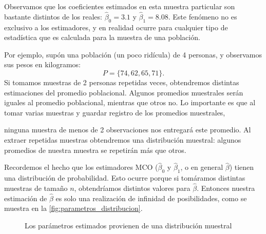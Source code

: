 \documentclass{report}\usepackage[]{graphicx}\usepackage[]{color}
\begin{document}
Observamos que los coeficientes estimados en esta muestra particular son bastante distintos de los reales: $\hat\beta_0 = 3.1$ y $\hat\beta_1 = 8.08$.
Este fenómeno no es exclusivo a los estimadores, y en realidad ocurre para cualquier tipo de estadística que es calculada para la muestra de una población.

Por ejemplo, supón una población (un poco ridícula) de 4 personas, y observamos sus pesos en kilogramos:
\begin{equation*}
P = \{74, 62, 65, 71\}.
\end{equation*}
Si tomamos muestras de 2 personas repetidas veces, obtendremos distintas estimaciones del promedio poblacional. Algunos promedios muestrales serán iguales al promedio poblacional, mientras que otros no. Lo importante es que al tomar varias muestras y guardar registro de los promedios muestrales,

ninguna muestra de menos de 2 observaciones nos entregará este promedio. Al extraer repetidas muestras obtendremos una distribución muestral: algunos promedios de nuestra muestra se repetirán más que otros.
\hrulefill

Recordemos el hecho que los estimadores MCO ($\hat\beta_0$ y $\hat\beta_1$, o en general $\hat\beta$) tienen una distribución de probabilidad.
Esto ocurre porque si tomáramos distintas muestras de tamaño $n$, obtendríamos distintos valores para $\hat\beta$.
Entonces nuestra estimación de $\hat\beta$ es solo una realización de infinidad de posibilidades, como se muestra en la \autoref{fig:parametros_distribucion}.

\begin{figure}[htb]
  \centering
  \caption{Los parámetros estimados provienen de una distribución muestral}
  \label{fig:parametros_distribucion}
\end{figure}%
\end{document}
